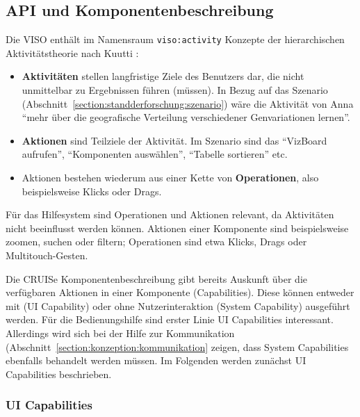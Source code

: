 \documentclass[
	headsepline,
	footsepline,
	fontsize=12pt,
	bibliography=totoc
]{scrbook}
\begin{document}

\subsection{API und Komponentenbeschreibung}
\label{section:konzeption:bedienung:api}


Die VISO enthält im Namensraum \texttt{viso:activity} Konzepte der hierarchischen Aktivitätstheorie nach Kuutti \cite{Kuutti1996}:

\begin{itemize}
	\item \textbf{Aktivitäten} stellen langfristige Ziele des Benutzers dar, die nicht unmittelbar zu Ergebnissen führen (müssen). In Bezug auf das Szenario (Abschnitt~\ref{section:standderforschung:szenario}) wäre die Aktivität von Anna \enquote{mehr über die geografische Verteilung verschiedener Genvariationen lernen}.
	\item \textbf{Aktionen} sind Teilziele der Aktivität. Im Szenario sind das \enquote{VizBoard aufrufen}, \enquote{Komponenten auswählen}, \enquote{Tabelle sortieren} etc.
	\item Aktionen bestehen wiederum aus einer Kette von \textbf{Operationen}, also beispielsweise Klicks oder Drags.
\end{itemize}

Für das Hilfesystem sind Operationen und Aktionen relevant, da Aktivitäten nicht beeinflusst werden können. Aktionen einer Komponente sind beispielsweise zoomen, suchen oder filtern; Operationen sind etwa Klicks, Drags oder Multitouch-Gesten.

Die CRUISe Komponentenbeschreibung gibt bereits Auskunft über die verfügbaren Aktionen in einer Komponente (Capabilities). Diese können entweder mit (UI Capability) oder ohne Nutzerinteraktion (System Capability) ausgeführt werden. Für die Bedienungshilfe sind erster Linie UI Capabilities interessant. Allerdings wird sich bei der Hilfe zur Kommunikation (Abschnitt~\ref{section:konzeption:kommunikation} zeigen, dass System Capabilities ebenfalls behandelt werden müssen. Im Folgenden werden zunächst UI Capabilities beschrieben.

\subsubsection{UI Capabilities}
\end{document}
